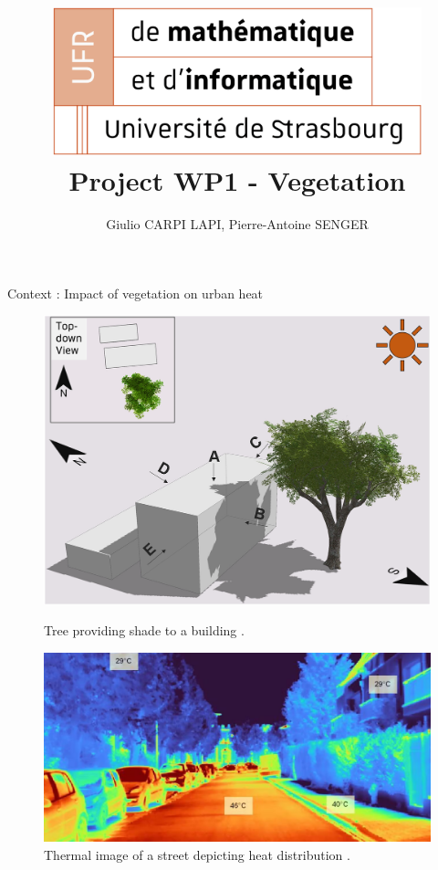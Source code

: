 \documentclass[10pt]{beamer}
\title[exMA WP1 Vegetation]{
  \includegraphics[width=0.8\textwidth]{images/logo_ufr.png}
  Project WP1 - Vegetation}
\author[PA-Giulio]{Giulio CARPI LAPI, Pierre-Antoine SENGER}
\begin{document}
\frame{\titlepage}

\begin{frame}{Context : Impact of vegetation on urban heat}
  \begin{figure}[H]
    \centering
    \begin{minipage}{0.49\textwidth}
        \centering
        \includegraphics[width=\textwidth]{images/TreeShade.png}
        \caption{Tree providing shade to a building \cite{img:TreeShade}.}
    \end{minipage}\hfill
    \begin{minipage}{0.49\textwidth}
        \centering
        \includegraphics[width=\textwidth]{images/heat_street.png}
        \caption{Thermal image of a street depicting heat distribution \cite{img:street_thermography}.}
    \end{minipage}
  \end{figure}
\end{frame}
\end{document}
